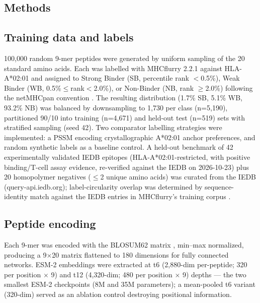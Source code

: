 \begin{methods}
\section{Methods}\label{sec:methods}

\subsection{Training data and labels}
100,000 random 9-mer peptides were generated by uniform sampling of the 20 standard amino acids. Each was labelled with MHCflurry 2.2.1 against HLA-A*02:01 and assigned to Strong Binder (SB, percentile rank $<$0.5\%), Weak Binder (WB, 0.5\%$\leq$rank$<$2.0\%), or Non-Binder (NB, rank $\geq$2.0\%) following the netMHCpan convention \citep{Reynisson20}. The resulting distribution (1.7\% SB, 5.1\% WB, 93.2\% NB) was balanced by downsampling to 1,730 per class (n=5,190), partitioned 90/10 into training (n=4,671) and held-out test (n=519) sets with stratified sampling (seed 42). Two comparator labelling strategies were implemented: a PSSM encoding crystallographic A*02:01 anchor preferences, and random synthetic labels as a baseline control. A held-out benchmark of 42 experimentally validated IEDB epitopes (HLA-A*02:01-restricted, with positive binding/T-cell assay evidence, re-verified against the IEDB on 2026-10-23) plus 20 homopolymer negatives ($\leq$2 unique amino acids) was curated from the IEDB (query-api.iedb.org); label-circularity overlap was determined by sequence-identity match against the IEDB entries in MHCflurry's training corpus \citep{Vita19}.

\subsection{Peptide encoding}
Each 9-mer was encoded with the BLOSUM62 matrix \citep{Henikoff92}, min--max normalized, producing a 9$\times$20 matrix flattened to 180 dimensions for fully connected networks. ESM-2 embeddings \citep{Lin23} were extracted at t6 (2,880-dim per-peptide; 320 per position $\times$ 9) and t12 (4,320-dim; 480 per position $\times$ 9) depths --- the two smallest ESM-2 checkpoints (8M and 35M parameters); a mean-pooled t6 variant (320-dim) served as an ablation control destroying positional information.


\end{methods}
